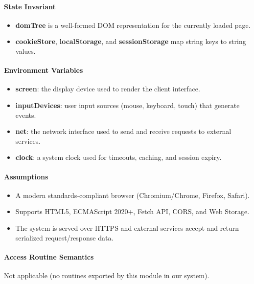 \documentclass[12pt, titlepage]{article}
\begin{document}
  \paragraph{State Invariant}
  \begin{itemize}
    \item \textbf{domTree} is a well-formed DOM representation for the currently loaded page.
    \item \textbf{cookieStore}, \textbf{localStorage}, and \textbf{sessionStorage} map string keys to string values.
  \end{itemize}


  \paragraph{Environment Variables}
  \begin{itemize}
    \item \textbf{screen}: the display device used to render the client interface.
    \item \textbf{inputDevices}: user input sources (mouse, keyboard, touch) that generate events.
    \item \textbf{net}: the network interface used to send and receive requests to external services.
    \item \textbf{clock}: a system clock used for timeouts, caching, and session expiry.
  \end{itemize}



  \paragraph{Assumptions}
  \begin{itemize}
    \item A modern standards-compliant browser (Chromium/Chrome, Firefox, Safari).
    \item Supports HTML5, ECMAScript 2020+, Fetch API, CORS, and Web Storage.
    \item The system is served over HTTPS and external services accept and return serialized request/response data.
  \end{itemize}

  \paragraph{Access Routine Semantics}
  Not applicable (no routines exported by this module in our system).
\end{document}
